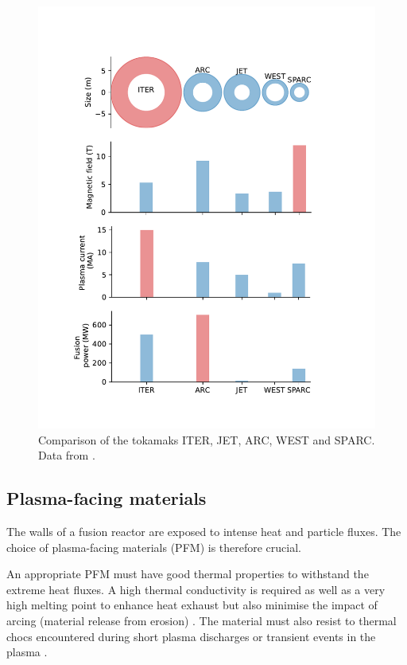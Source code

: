 \begin{figure}
    \includegraphics[width=0.9\linewidth]{Figures/Chapter1/comparison_reactors.pdf}
    \caption{Comparison of the tokamaks ITER, JET, ARC, WEST and SPARC. Data from \cite{delaporte-mathurin_remdelaportemathurinfusion-world_2022}.}
\end{figure}

\subsection{Plasma-facing materials}

The walls of a fusion reactor are exposed to intense heat and particle fluxes.
The choice of plasma-facing materials (PFM) is therefore crucial.

An appropriate PFM must have good thermal properties to withstand the extreme heat fluxes.
A high thermal conductivity is required as well as a very high melting point to enhance heat exhaust but also minimise the impact of arcing (material release from erosion) .
The material must also resist to thermal chocs encountered during short plasma discharges or transient events in the plasma .

